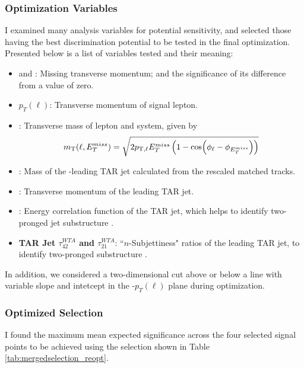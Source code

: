 \subsubsection{Optimization Variables}
I examined many analysis variables for potential sensitivity, and selected those having the best discrimination potential to be tested in the final optimization. Presented below is a list of variables tested and their meaning:

\begin{itemize}
  \item \textbf{\met} and \metsig: Missing transverse momentum; and the significance of its difference from a value of zero.
  \item \textbf{$p_T(\ell)$}: Transverse momentum of signal lepton.
  \item \textbf{\mtlepmet}: Transverse mass of lepton and \met system, given by
  \begin{equation}
  m_{\text{T}}(\ell, E_{T}^{miss}) = \sqrt{2 p_{\text{T},\ell} E_{T}^{miss} \left( 1 - \cos(\phi_\ell - \phi_{E_{T}^{miss}}) \right) }
  \end{equation}
  \item \textbf{\mTAR}: Mass of the \pT-leading TAR jet calculated from the rescaled matched tracks.
  \item \textbf{\ptTAR}: Transverse momentum of the leading TAR jet.
  \item \textbf{\DtwoTAR}: Energy correlation function of the TAR jet, which helps to identify two-pronged jet substructure \cite{DTwo}.
  \item \textbf{TAR Jet $\tau_{42}^{WTA}$ and $\tau_{21}^{WTA}$}: ``$n$-Subjettiness" ratios of the leading TAR jet, to identify two-pronged substructure \cite{Tau42}.
\end{itemize}

In addition, we considered a two-dimensional cut above or below a line with variable slope and intetcept in the \met-$p_T(\ell)$ plane during optimization.

\subsubsection{Optimized Selection}

I found the maximum mean expected significance across the four selected signal points to be achieved using the selection shown in Table \ref{tab:mergedselection_reopt}.

